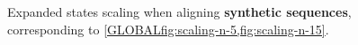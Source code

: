 \begin{figure}[H]
  \centering
  \hfill
  \caption{Expanded states scaling when aligning \textbf{synthetic sequences},
    corresponding to \cref{GLOBALfig:scaling-n-5,fig:scaling-n-15}.
    }
  \label{GLOBALfig:expanded}
\end{figure}
